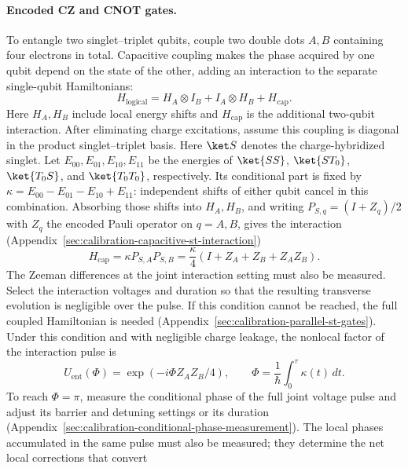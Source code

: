 \paragraph{Encoded CZ and CNOT gates.}
To entangle two singlet--triplet qubits, couple two double dots
$A,B$ containing four electrons in total.
Capacitive coupling makes the phase acquired by one qubit depend
on the state of the other, adding an interaction to the separate
single-qubit Hamiltonians:
\begin{equation}
 H_{\mathrm{logical}}
   =H_A\otimes I_B+I_A\otimes H_B+H_{\mathrm{cap}}.
 \label{eq:st-coupled-logical-hamiltonian}
\end{equation}
Here $H_A,H_B$ include local energy shifts and $H_{\mathrm{cap}}$
is the additional two-qubit interaction.
After eliminating charge excitations, assume this coupling is
diagonal in the product singlet--triplet basis. Here $\ket S$
denotes the charge-hybridized singlet. Let
$E_{00},E_{01},E_{10},E_{11}$ be the energies of $\ket{SS}$,
$\ket{ST_0}$, $\ket{T_0S}$, and $\ket{T_0T_0}$, respectively.
Its conditional part is fixed by
$\kappa=E_{00}-E_{01}-E_{10}+E_{11}$: independent shifts of
either qubit cancel in this combination. Absorbing those shifts
into $H_A,H_B$, and writing $P_{S,q}=(I+Z_q)/2$ with $Z_q$ the
encoded Pauli operator on $q=A,B$, gives the interaction
(Appendix~\ref{sec:calibration-capacitive-st-interaction})
\begin{equation}
 H_{\mathrm{cap}}=\kappa P_{S,A}P_{S,B}
     =\frac{\kappa}{4}(I+Z_A+Z_B+Z_AZ_B).
 \label{eq:st-capacitive-coupling}
\end{equation}
The Zeeman differences at the joint interaction setting must also
be measured. Select the interaction voltages and duration so that
the resulting transverse evolution is negligible over the pulse.
If this condition cannot be reached, the full coupled Hamiltonian is needed
(Appendix~\ref{sec:calibration-parallel-st-gates}). Under this
condition and with negligible charge leakage, the nonlocal factor
of the interaction pulse is
\begin{equation}
 U_{\mathrm{ent}}(\Phi)=\exp(-i\Phi Z_AZ_B/4),
 \qquad \Phi=\frac{1}{\hbar}\int_0^\tau\kappa(t)\,dt.
 \label{eq:st-entangling-gate}
\end{equation}
To reach $\Phi=\pi$, measure the conditional phase of the full
joint voltage pulse and adjust its barrier and detuning settings
or its duration (Appendix~\ref{sec:calibration-conditional-phase-measurement}).
The local phases accumulated in the same pulse must also be
measured; they determine the net local corrections that convert
